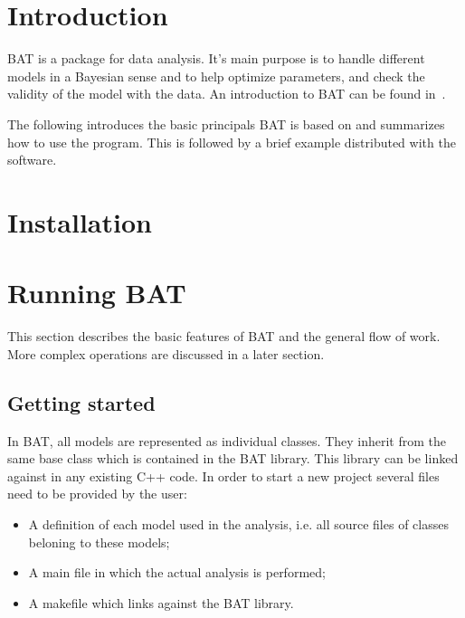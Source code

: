 \documentclass[11pt, a4paper]{article}
\begin{document}
\section{Introduction}
\label{section:introduction}

{\sc BAT} is a package for data analysis. It's main purpose is to
handle different models in a Bayesian sense and to help optimize
parameters, and check the validity of the model with the data. An
introduction to {\sc BAT} can be found in~\cite{Caldwell:2008fw}.

The following introduces the basic principals {\sc BAT} is based on
and summarizes how to use the program. This is followed by a brief
example distributed with the software.

\section{Installation} 
\label{section:installation}

\section{Running BAT}
\label{section:runningBAT}

This section describes the basic features of {\sc BAT} and the general
flow of work. More complex operations are discussed in a later
section.

\subsection{Getting started} 

In {\sc BAT}, all models are represented as individual classes. They
inherit from the same base class which is contained in the {\sc BAT}
library. This library can be linked against in any existing C++
code. In order to start a new project several files need to be
provided by the user:
% 
\begin{itemize}
\item A definition of each model used in the analysis, i.e. all source
  files of classes beloning to these models;
\item A main file in which the actual analysis is performed; 
\item A makefile which links against the {\sc BAT} library. 
\end{itemize} 
\end{document}
